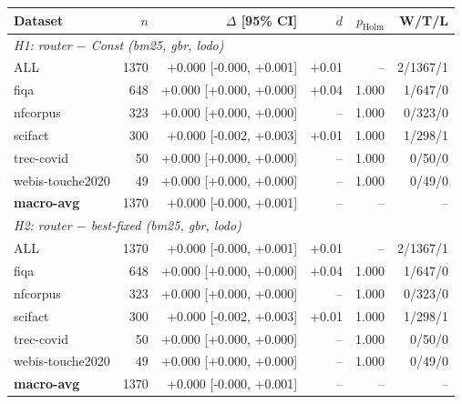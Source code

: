 \begin{tabular}{lrrrrr}
\hline
Dataset & $n$ & $\Delta$ [95\% CI] & $d$ & $p_{\mathrm{Holm}}$ & W/T/L \\
\hline
\multicolumn{6}{l}{\textit{H1: router $-$ Const (bm25, gbr, lodo)}} \\
ALL & 1370 & +0.000 [-0.000, +0.001] & +0.01 & -- & 2/1367/1 \\
fiqa & 648 & +0.000 [+0.000, +0.000] & +0.04 & 1.000 & 1/647/0 \\
nfcorpus & 323 & +0.000 [+0.000, +0.000] & -- & 1.000 & 0/323/0 \\
scifact & 300 & +0.000 [-0.002, +0.003] & +0.01 & 1.000 & 1/298/1 \\
trec-covid & 50 & +0.000 [+0.000, +0.000] & -- & 1.000 & 0/50/0 \\
webis-touche2020 & 49 & +0.000 [+0.000, +0.000] & -- & 1.000 & 0/49/0 \\
\textbf{macro-avg} & 1370 & +0.000 [-0.000, +0.001] & -- & -- & -- \\
\hline
\multicolumn{6}{l}{\textit{H2: router $-$ best-fixed (bm25, gbr, lodo)}} \\
ALL & 1370 & +0.000 [-0.000, +0.001] & +0.01 & -- & 2/1367/1 \\
fiqa & 648 & +0.000 [+0.000, +0.000] & +0.04 & 1.000 & 1/647/0 \\
nfcorpus & 323 & +0.000 [+0.000, +0.000] & -- & 1.000 & 0/323/0 \\
scifact & 300 & +0.000 [-0.002, +0.003] & +0.01 & 1.000 & 1/298/1 \\
trec-covid & 50 & +0.000 [+0.000, +0.000] & -- & 1.000 & 0/50/0 \\
webis-touche2020 & 49 & +0.000 [+0.000, +0.000] & -- & 1.000 & 0/49/0 \\
\textbf{macro-avg} & 1370 & +0.000 [-0.000, +0.001] & -- & -- & -- \\
\hline
\end{tabular}